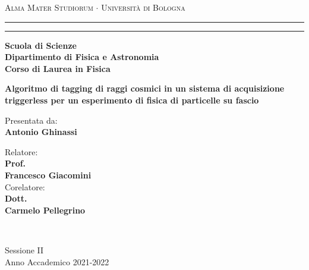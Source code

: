 \documentclass[../main.tex]{subfiles}
\begin{document}
\begin{titlepage}
    \begin{center}
        {{\Large{\textsc{Alma Mater Studiorum $\cdot$ Università di
                            Bologna}}}} \rule[0.1cm]{15.8cm}{0.1mm}
        \rule[0.5cm]{15.8cm}{0.6mm}
        {\small{\bf         Scuola di Scienze \\
                Dipartimento di Fisica e Astronomia\\
                Corso di Laurea in Fisica }}
    \end{center}
    \vspace{15mm}
    \begin{center}
        \vspace{3cm}
        \Large
        {\textbf{Algoritmo di tagging di raggi cosmici in un sistema di acquisizione triggerless per un esperimento di fisica di particelle su fascio}}
        \vspace{1cm}
    \end{center}
    \vspace{20mm}
    \par
    \noindent

    \vspace{8mm}
    \begin{minipage}[t]{0.34\textwidth}
        \begin{flushleft}
            {Presentata da: \\ \textbf{Antonio Ghinassi}}
        \end{flushleft}
    \end{minipage}
    \begin{minipage}[t]{0.64\textwidth}
        \begin{flushright}
            Relatore: \\
            \textbf{Prof.} \\
            \textbf{Francesco Giacomini} \\
            \vspace{0.5 cm}
            Corelatore: \\
            \textbf{Dott.}
            \\ \textbf{Carmelo Pellegrino}
        \end{flushright}
    \end{minipage}\\

    \vspace*{\fill}
    \begin{center}
        {\large{ Sessione II\\
                Anno Accademico 2021-2022}}
    \end{center}
\end{titlepage}
\end{document}
